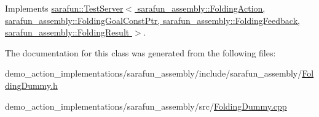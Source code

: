 Implements \hyperlink{classsarafun_1_1TestServer_a85b9721105c2a4b46bae26428433513e}{sarafun\-::\-Test\-Server$<$ sarafun\-\_\-assembly\-::\-Folding\-Action, sarafun\-\_\-assembly\-::\-Folding\-Goal\-Const\-Ptr, sarafun\-\_\-assembly\-::\-Folding\-Feedback, sarafun\-\_\-assembly\-::\-Folding\-Result $>$}.



The documentation for this class was generated from the following files\-:\begin{DoxyCompactItemize}
\item 
demo\-\_\-action\-\_\-implementations/sarafun\-\_\-assembly/include/sarafun\-\_\-assembly/\hyperlink{FoldingDummy_8h}{Folding\-Dummy.\-h}\item 
demo\-\_\-action\-\_\-implementations/sarafun\-\_\-assembly/src/\hyperlink{FoldingDummy_8cpp}{Folding\-Dummy.\-cpp}\end{DoxyCompactItemize}
